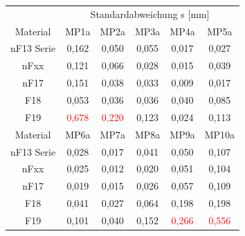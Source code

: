 \documentclass[12pt,a4paper,parskip]{scrartcl}
\begin{document}
\begin{table}[hbtp]
\begin{tabular}{cccccc}
     \toprule
      & \multicolumn{5}{c}{Standardabweichung s [mm]}\\
   \cmidrule(ll){2-6}
   Material    & MP1a & MP2a & MP3a & MP4a & MP5a \\ 
   \midrule
    nF13 Serie&0,162&0,050&0,055&0,017&0,027\\
    nFxx &0,121&0,066&0,028&0,015&0,039\\
    nF17 &0,151&0,038&0,033&0,009&0,017\\
    F18 &0,053&0,036&0,036&0,040&0,085\\
    F19 &\textcolor{red}{0,678}&\textcolor{red}{0,220}&0,123&0,024&0,113\\
     \bottomrule
     \toprule
  Material    & MP6a & MP7a & MP8a & MP9a & MP10a  \\
  \midrule
    nF13 Serie &0,028&0,017&0,041&0,050&0,107\\
 nFxx   &0,025&0,012&0,020&0,051&0,104\\
nF17  &0,019&0,015&0,026&0,057&0,109\\ 
F18 &0,041&0,027&0,064&0,198&0,198\\
F19 &0,101&0,040&0,152&\textcolor{red}{0,266}&\textcolor{red}{0,556}\\
   \bottomrule 
         
   \end{tabular} 
\end{table}
\newpage
\end{document}
